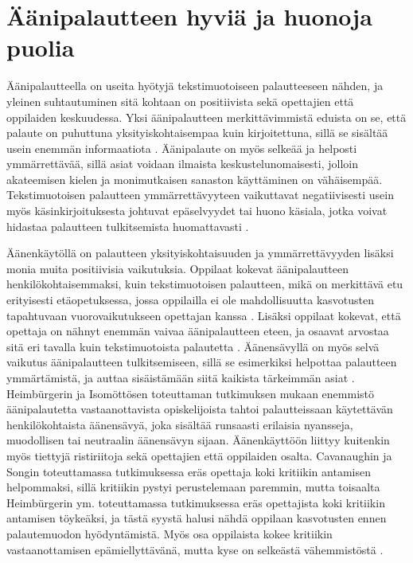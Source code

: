 \documentclass[utf8]{gradu3}
\begin{document}
\section{Äänipalautteen hyviä ja huonoja puolia}

Äänipalautteella on useita hyötyjä tekstimuotoiseen palautteeseen nähden, ja yleinen suhtautuminen sitä kohtaan on positiivista sekä opettajien että oppilaiden keskuudessa. Yksi äänipalautteen merkittävimmistä eduista on se, että palaute on puhuttuna yksityiskohtaisempaa kuin kirjoitettuna, sillä se sisältää usein enemmän informaatiota \parencite{attitudes}. Äänipalaute on myös selkeää ja helposti ymmärrettävää, sillä asiat voidaan ilmaista keskustelunomaisesti, jolloin akateemisen kielen ja monimutkaisen sanaston käyttäminen on vähäisempää. Tekstimuotoisen palautteen ymmärrettävyyteen vaikuttavat negatiivisesti usein myös käsinkirjoituksesta johtuvat epäselvyydet tai huono käsiala, jotka voivat hidastaa palautteen tulkitsemista huomattavasti \parencite{developing}.

Äänenkäytöllä on palautteen yksityiskohtaisuuden ja ymmärrettävyyden lisäksi monia muita positiivisia vaikutuksia. Oppilaat kokevat äänipalautteen henkilökohtaisemmaksi, kuin tekstimuotoisen palautteen, mikä on merkittävä etu erityisesti etäopetuksessa, jossa oppilailla ei ole mahdollisuutta kasvotusten tapahtuvaan vuorovaikutukseen opettajan kanssa \parencite{using, distanceLearning}. Lisäksi oppilaat kokevat, että opettaja on nähnyt enemmän vaivaa äänipalautteen eteen, ja osaavat arvostaa sitä eri tavalla kuin tekstimuotoista palautetta \parencite{listenOrToRead}. Äänensävyllä on myös selvä vaikutus äänipalautteen tulkitsemiseen, sillä se esimerkiksi helpottaa palautteen ymmärtämistä, ja auttaa sisäistämään siitä kaikista tärkeimmän asiat \parencite{attitudes}. Heimbürgerin ja Isomöttösen \parencite*{moderating} toteuttaman tutkimuksen mukaan enemmistö äänipalautetta vastaanottavista opiskelijoista tahtoi palautteissaan käytettävän henkilökohtaista äänensävyä, joka sisältää runsaasti erilaisia nyansseja, muodollisen tai neutraalin äänensävyn sijaan. Äänenkäyttöön liittyy kuitenkin myös tiettyjä ristiriitoja sekä opettajien että oppilaiden osalta. Cavanaughin ja Songin \parencite{versus} toteuttamassa tutkimuksessa eräs opettaja koki kritiikin antamisen helpommaksi, sillä kritiikin pystyi perustelemaan paremmin, mutta toisaalta Heimbürgerin ym. \parencite*{academics} toteuttamassa tutkimuksessa eräs opettajista koki kritiikin antamisen töykeäksi, ja tästä syystä halusi nähdä oppilaan kasvotusten ennen palautemuodon hyödyntämistä. Myös osa oppilaista kokee kritiikin vastaanottamisen epämiellyttävänä, mutta kyse on selkeästä vähemmistöstä \parencite{voice}. 
\end{document}

